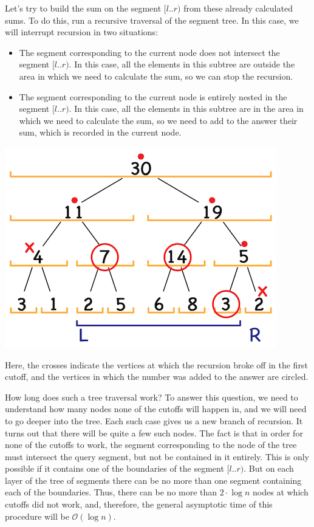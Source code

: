 \documentclass[11pt]{article}
\begin{document}
Let's try to build the sum on the segment \([l..r)\) from these already calculated sums. To do
this, run a recursive traversal of the segment tree. In this case, we will interrupt recursion
in two situations:
\begin{itemize}
\item The segment corresponding to the current node does not intersect the segment \([l..r)\). In this
case, all the elements in this subtree are outside the area in which we need to calculate the
sum, so we can stop the recursion.
\item The segment corresponding to the current node is entirely nested in the segment \([l..r)\). In
this case, all the elements in this subtree are in the area in which we need to calculate the
sum, so we need to add to the answer their sum, which is recorded in the current node.
\end{itemize}
\begin{center}
\includegraphics[width=.9\linewidth]{./images/segment-tree-5.png}
\end{center}

Here, the crosses indicate the vertices at which the recursion broke off in the first cutoff,
and the vertices in which the number was added to the answer are circled.

How long does such a tree traversal work? To answer this question, we need to understand how
many nodes none of the cutoffs will happen in, and we will need to go deeper into the tree. Each
such case gives us a new branch of recursion. It turns out that there will be quite a few such
nodes. The fact is that in order for none of the cutoffs to work, the segment corresponding to
the node of the tree must intersect the query segment, but not be contained in it entirely. This
is only possible if it contains one of the boundaries of the segment \([l..r)\). But on each layer
of the tree of segments there can be no more than one segment containing each of the
boundaries. Thus, there can be no more than \(2\cdot\log n\) nodes at which cutoffs did not work,
and, therefore, the general asymptotic time of this procedure will be \(\mathcal{O}(\log n)\).
\end{document}
